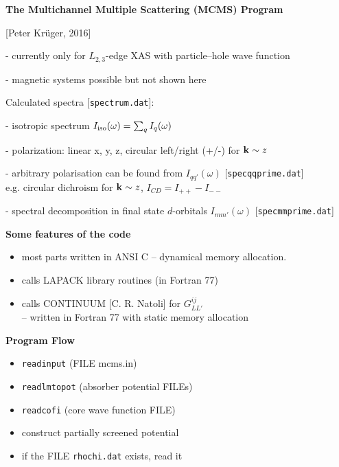 \documentclass[landscape]{slides}
\newcommand{\page}{\end{slide}\begin{slide}}
\begin{document}
\begin{slide}
{\bf The Multichannel Multiple Scattering (MCMS) Program} 

\hfill [Peter Kr\"uger, 2016]

- currently only for $L_{2,3}$-edge XAS with particle--hole wave function

- magnetic systems possible but not shown here

Calculated spectra [{\tt spectrum.dat}]:

- isotropic spectrum  \quad $I_{\rm iso}(\omega) = \sum_q I_q(\omega)$

- polarization: linear x, y, z, circular left/right (+/-) for ${\bf k}\sim z$

- arbitrary polarisation can be found from 
 $I_{qq'}(\omega)$  [{\tt specqqprime.dat}]\\
e.g. circular dichroism for ${\bf k}\sim z$, $I_{CD} = I_{++} - I_{--}$


- spectral decomposition in final state $d$-orbitals 
$I_{mm'}(\omega)$ [{\tt specmmprime.dat}]


\page
{\bf Some features of the code}

\begin{itemize}
\item most parts written in ANSI C
-- dynamical memory allocation.

\item calls LAPACK library routines (in Fortran 77)

\item calls CONTINUUM [C. R. Natoli] for $G^{ij}_{LL'}$ \\
 -- written in Fortran 77 with static memory allocation
\end{itemize}

\newpage
{\bf Program Flow}

\begin{itemize}
\item {\tt readinput} \quad (FILE mcms.in)

\item {\tt readlmtopot} \quad (absorber potential FILEs)

\item {\tt readcofi} \quad (core wave function FILE)

\item construct partially screened potential

\item if the FILE {\tt rhochi.dat} exists, read it


\end{itemize}
\end{slide}
\end{document}
